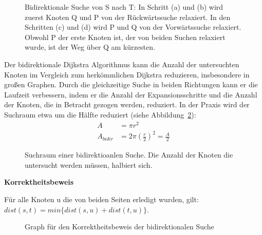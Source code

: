 \begin{figure}[H]
    \centering
    
    \caption[Bidirektionale Suche von s nach t]{Bidirektionale Suche von S nach T: In Schritt (a) und (b) wird zuerst Knoten Q und P von der
        Rückwärtssuche relaxiert. In den Schritten (c) und (d) wird P und Q von der Vorwärtssuche
        relaxiert. Obwohl P der erste Knoten  ist, der von beiden Suchen relaxiert wurde, ist der
        Weg über Q am kürzesten.}
    \label{fig:bidirectional_dijkstra}
\end{figure}

Der bidirektionale Dijkstra Algorithmus kann die Anzahl der untersuchten Knoten im Vergleich zum
herkömmlichen Dijkstra reduzieren, insbesondere in großen Graphen. Durch die gleichzeitige Suche in
beiden Richtungen kann er die Laufzeit verbessern, indem er die Anzahl der Expansionsschritte und
die Anzahl der Knoten, die in Betracht gezogen werden, reduziert. In der Praxis wird der Suchraum
etwa um die Hälfte reduziert (siehe Abbildung~\ref{fig:bidir_searchspace}): %
\begin{align*}
    A         & = \pi r^2                               \\
    A_{bidir} & = 2 \pi (\frac{r}{2})^{2} = \frac{A}{2}
\end{align*}
\begin{figure}[H]
    \centering
    
    \caption[Suchraum einer bidirektionalen Suche]{Suchraum einer bidirektioanlen Suche. Die Anzahl der Knoten die untersucht werden
        müssen, halbiert sich.}
    \label{fig:bidir_searchspace}
\end{figure}
\textbf{Korrektheitsbeweis}
\begin{lemma}
    Für alle Knoten u die von beiden Seiten erledigt wurden, gilt:
    \centering
    ${dist(s,t) = min \{ dist(s,u) + dist(t,u) \}}$.
\end{lemma}
\begin{figure}[h]
    \centering
    \SetVertexStyle[FillColor=gray,FillOpacity=0.3]
    \caption{Graph für den Korrektheitsbeweis der bidirektionalen Suche}
    \label{fig:bidir_proof}
\end{figure}
